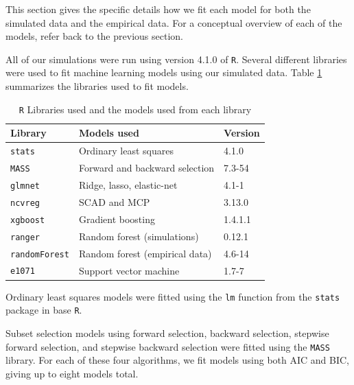 \documentclass{article}
\begin{document}
This section gives the specific details how we fit each model for both the simulated data and the empirical data. For a conceptual overview of each of the models, refer back to the previous section.

All of our simulations were run using version 4.1.0 of \lstinline!R!. Several different libraries were used to fit machine learning models using our simulated data. Table \ref{tab:model-libraries} summarizes the libraries used to fit models.

\begin{table}[h]
	\centering
	\caption{\lstinline!R! Libraries used and the models used from each library}
	\label{tab:model-libraries}
	\begin{tabular}{lll}\hline
		\textbf{Library}    	  & \textbf{Models used}                                 & \textbf{Version} \\ \hline
		\lstinline!stats! \cite{r}   	  & Ordinary least squares                               & 4.1.0            \\
		\lstinline!MASS! \cite{venables2002mass}   	  & Forward and backward selection                       & 7.3-54           \\
		\lstinline!glmnet! \cite{friedman2010regularization} 	  & Ridge, lasso, elastic-net                            & 4.1-1            \\
		\lstinline!ncvreg! \cite{breheny2011ncvreg}	      & SCAD and MCP                                         & 3.13.0           \\
		\lstinline!xgboost! \cite{chen2021xgboost}	  & Gradient boosting                                    & 1.4.1.1          \\
		\lstinline!ranger! \cite{wright2017ranger} 	  & Random forest (simulations)                          & 0.12.1           \\
		\lstinline!randomForest! \cite{liaw2002rf} & Random forest (empirical data)                       & 4.6-14           \\
		\lstinline!e1071! \cite{meyer2021e1071}  	  & Support vector machine                               & 1.7-7            \\\hline
	\end{tabular}
\end{table}

Ordinary least squares models were fitted using the \lstinline!lm! function from the \lstinline!stats! package in base \lstinline!R!.

Subset selection models using forward selection, backward selection, stepwise forward selection, and stepwise backward selection were fitted using the \lstinline!MASS! library. For each of these four algorithms, we fit models using both AIC and BIC, giving up to eight models total.
\end{document}
